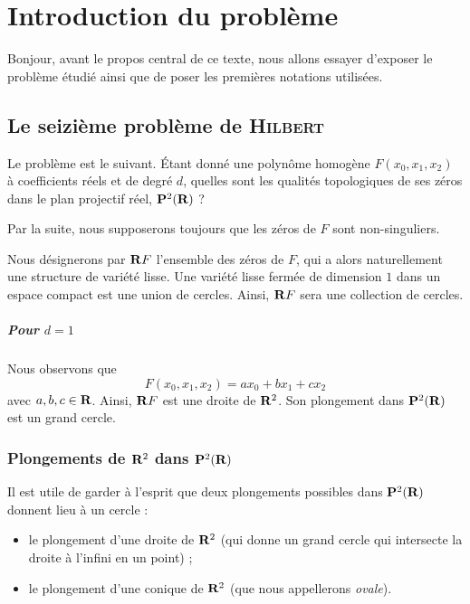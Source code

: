 \documentclass{livre}
\date{\today}
\begin{document}
\tableofcontents

\newpage
\chapter{Introduction du problème}
Bonjour,
avant le propos central de ce texte, nous allons essayer d'exposer le problème étudié ainsi que de poser les premières notations utilisées.

\section{Le seizième problème de \textsc{Hilbert}}

Le problème est le suivant. \'Etant donné une polynôme homogène $F(x_0,x_1,x_2)$ à coefficients réels et de degré $d$, quelles sont les qualités topologiques de ses zéros dans le plan projectif réel, $\mathbf{P}^{2}(\mathbf{R})$ ? 

Par la suite, nous supposerons toujours que les zéros de $F$ sont non-singuliers.

Nous désignerons par $\mathbf{R} F$ l'ensemble des zéros de $F$, qui a alors  naturellement une structure de variété lisse. Une variété lisse fermée de dimension $1$ dans un espace compact est une union de cercles. Ainsi, $\mathbf{R} F$ sera une collection de cercles.


\paragraph{Pour $d=1$}Nous observons que \[ F(x_0,x_1,x_2) = ax_0 + bx_1+cx_2 \]avec $a,b,c\in \mathbf{R}$. Ainsi, $\mathbf{R} F$ est une droite de $\mathbf{R}^{2}$. Son plongement dans $\mathbf{P}^{2}(\mathbf{R})$ est un grand cercle.

\subsection*{Plongements de $\mathbf{R}^{2}$ dans $\mathbf{P}^{2}(\mathbf{R})$}

Il est utile de garder à l'esprit que deux plongements possibles dans $\mathbf{P}^{2}(\mathbf{R})$ donnent lieu à un cercle :

\begin{itemize}
\item le plongement d'une droite de $\mathbf{R}^{2}$ (qui donne un grand cercle qui intersecte la droite à l'infini en un point) ;
\item le plongement d'une conique de $\mathbf{R}^{2}$ (que nous appellerons \textit{ovale}).
\end{itemize}
\end{document}
